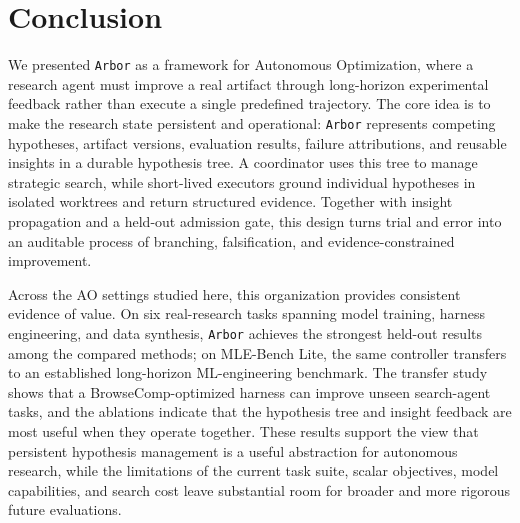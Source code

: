 \documentclass{llmxive}
\providecommand{\arbor}{\texttt{Arbor}}
\begin{document}
\FloatBarrier

\section{Conclusion}\label{sec:conclusion}

We presented \arbor{} as a framework for Autonomous Optimization, where a
research agent must improve a real artifact through long-horizon experimental
feedback rather than execute a single predefined trajectory. The core idea is
to make the research state persistent and operational: \arbor{} represents
competing hypotheses, artifact versions, evaluation results, failure
attributions, and reusable insights in a durable hypothesis tree. A coordinator
uses this tree to manage strategic search, while short-lived executors ground
individual hypotheses in isolated worktrees and return structured evidence.
Together with insight propagation and a held-out admission gate, this design
turns trial and error into an auditable process of branching, falsification,
and evidence-constrained improvement.

Across the AO settings studied here, this organization provides consistent
evidence of value. On six real-research tasks spanning model training, harness
engineering, and data synthesis, \arbor{} achieves the strongest held-out
results among the compared methods; on MLE-Bench Lite, the same controller
transfers to an established long-horizon ML-engineering benchmark. The transfer
study shows that a BrowseComp-optimized harness can improve unseen search-agent
tasks, and the ablations indicate that the hypothesis tree and insight feedback
are most useful when they operate together. These results support the view that
persistent hypothesis management is a useful abstraction for autonomous
research, while the limitations of the current task suite, scalar objectives,
model capabilities, and search cost leave substantial room for broader and more
rigorous future evaluations.

\FloatBarrier
\end{document}
